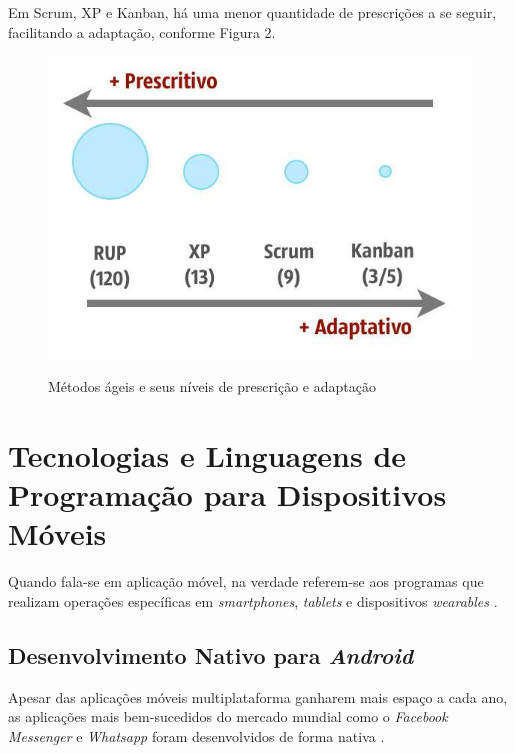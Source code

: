 Em Scrum, XP e Kanban, há uma menor quantidade de prescrições a se seguir, facilitando a adaptação, conforme Figura 2.

\FloatBarrier
\begin{figure}[!htbp]
	\centering
		\caption{Métodos ágeis e seus níveis de prescrição e adaptação} 
	\includegraphics[scale=0.5]{imagens/prescricao}
	\label{fig:figura2}
\end{figure}
\FloatBarrier

\section{Tecnologias e Linguagens de Programação para Dispositivos Móveis}

Quando fala-se em aplicação móvel, na verdade referem-se aos programas que realizam operações específicas em \textit{smartphones}, \textit{tablets} e dispositivos \textit{wearables} \cite{Abranches2018}.

\subsection{Desenvolvimento Nativo para \textit{Android}}

Apesar das aplicações móveis multiplataforma ganharem mais espaço a cada ano, as aplicações mais bem-sucedidos do mercado mundial como o \textit{Facebook Messenger} e \textit{Whatsapp} foram desenvolvidos de forma nativa \cite{Abranches2018}. 

